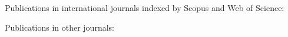 Publications in international journals indexed by Scopus and Web of Science:
\insertpapperScopus


Publications in other journals:
\insertpapperOther



